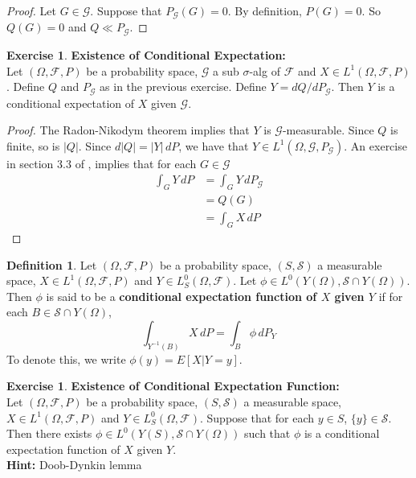 \documentclass[12pt]{amsart}
\theoremstyle{definition}
\newtheorem{defn}[definition]{Definition}
\newtheorem{ex}[definition]{Exercise}
\newcommand{\sig}{\sigma}
\newcommand{\Om}{\Omega}
\newcommand{\MF}{\mathcal{F}}
\newcommand{\MG}{\mathcal{G}}
\newcommand{\MS}{\mathcal{S}}
\newcommand{\dP}{\, d P}
\begin{document}
	\begin{proof}
	Let $G \in \MG$. Suppose that $P_{\MG}(G) = 0$. By definition, $P(G) = 0$. So $Q(G) = 0$ and $Q \ll P_{\MG}$.
	\end{proof}
	
	\begin{ex}\textbf{Existence of Conditional Expectation:}\\
	Let $(\Om, \MF, P)$ be a probability space, $\MG$ a sub $\sig$-alg of $\MF$ and $X \in L^1(\Om, \MF, P)$. Define $Q$ and $P_{\MG}$ as in the previous exercise. Define $Y = dQ/dP_{\MG}$. Then $Y$ is a conditional expectation of $X$ given $\MG$.
	\end{ex}
	
	\begin{proof}
		The Radon-Nikodym theorem implies that $Y$ is $\MG$-measurable. Since $Q$ is finite, so is $|Q|$. Since $d|Q| = |Y|\dP$, we have that $Y \in L^1(\Om, \MG, P_{\MG})$. An exercise in section $3.3$ of \cite{measure}, implies that for each $G \in \MG$ 
		\begin{align*}
		\int_G Y \dP 
		&= \int_G Y \dP_{\MG} \\
		&= Q(G) \\
		&= \int_G X \dP
\end{align*}					
	\end{proof}	
	
	\begin{defn}
	Let $(\Om, \MF, P)$ be a probability space, $(S, \MS)$ a measurable space, $X \in L^1(\Om, \MF, P)$ and $Y \in L^0_S(\Om, \MF)$. Let $\phi \in L^0(Y(\Om), \MS \cap Y(\Om))$. Then $\phi$ is said to be a \textbf{conditional expectation function of $X$ given $Y$} if for each $B \in \MS \cap Y(\Om)$, $$\int_{Y^{-1}(B)} X \dP = \int_{B} \phi \dP_Y$$
	To denote this, we write $\phi(y) = E[X|Y = y]$.
	\end{defn}
	
	
	
	\begin{ex} \textbf{Existence of Conditional Expectation Function:} \\
	Let $(\Om, \MF, P)$ be a probability space, $(S, \MS)$ a measurable space, $X \in L^1(\Om, \MF, P)$ and $Y \in L^0_S(\Om, \MF)$. Suppose that for each $y \in S$, $\{y\} \in \MS$. Then there exists $\phi \in L^0(Y(S), \MS \cap Y(\Om))$ such that $\phi$ is a conditional expectation function of $X$ given $Y$.\\
	\textbf{Hint:} Doob-Dynkin lemma
	\end{ex}	
	
\end{document}
